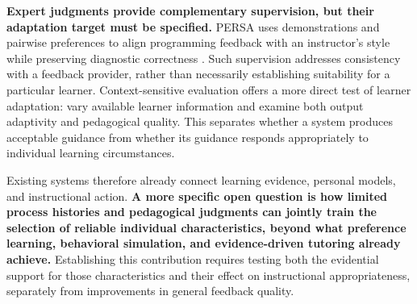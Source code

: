 \textbf{Expert judgments provide complementary supervision, but their adaptation target must be specified.} PERSA uses demonstrations and pairwise preferences to align programming feedback with an instructor's style while preserving diagnostic correctness \citep{kumar2026persa}. Such supervision addresses consistency with a feedback provider, rather than necessarily establishing suitability for a particular learner. Context-sensitive evaluation offers a more direct test of learner adaptation: \citet{borchers2025adaptivity} vary available learner information and examine both output adaptivity and pedagogical quality. This separates whether a system produces acceptable guidance from whether its guidance responds appropriately to individual learning circumstances.

Existing systems therefore already connect learning evidence, personal models, and instructional action. \textbf{A more specific open question is how limited process histories and pedagogical judgments can jointly train the selection of reliable individual characteristics, beyond what preference learning, behavioral simulation, and evidence-driven tutoring already achieve.} Establishing this contribution requires testing both the evidential support for those characteristics and their effect on instructional appropriateness, separately from improvements in general feedback quality.
